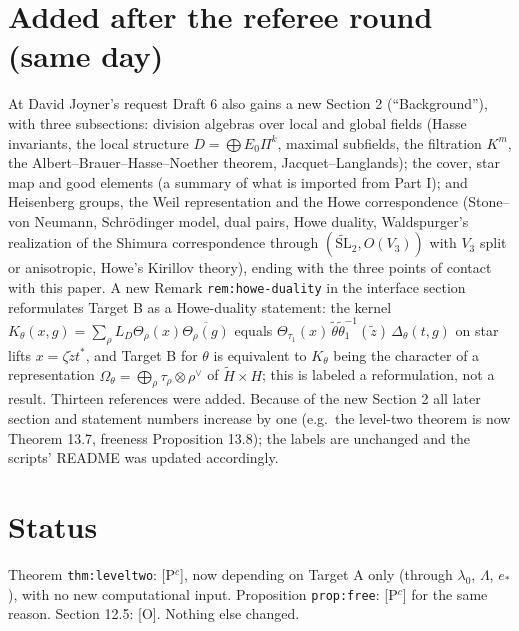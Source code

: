 \documentclass[11pt]{article}
\begin{document}
\section*{Added after the referee round (same day)}
At David Joyner's request Draft 6 also gains a new Section 2
(``Background''), with three subsections: division algebras over local
and global fields (Hasse invariants, the local structure
$D=\bigoplus E_0\Pi^k$, maximal subfields, the filtration $K^m$, the
Albert--Brauer--Hasse--Noether theorem, Jacquet--Langlands); the cover,
star map and good elements (a summary of what is imported from Part I);
and Heisenberg groups, the Weil representation and the Howe
correspondence (Stone--von Neumann, Schr\"odinger model, dual pairs,
Howe duality, Waldspurger's realization of the Shimura correspondence
through $(\widetilde{\mathrm{SL}}_2,O(V_3))$ with $V_3$ split or
anisotropic, Howe's Kirillov theory), ending with the three points of
contact with this paper.  A new Remark \texttt{rem:howe-duality} in the
interface section reformulates Target B as a Howe-duality statement:
the kernel $K_\theta(x,g)=\sum_\rho L_D\Theta_\rho(x)\overline{\Theta_\rho(g)}$
equals $\Theta_{\tau_1}(x)\,\tilde\theta\tilde\theta_1^{-1}(\tilde z)\,\Delta_\theta(t,g)$
on star lifts $x=\zeta\tilde zt^*$, and Target B for $\theta$ is
equivalent to $K_\theta$ being the character of a representation
$\Omega_\theta=\bigoplus_\rho\tau_\rho\otimes\rho^\vee$ of $\tilde H\times H$;
this is labeled a reformulation, not a result.  Thirteen references
were added.  Because of the new Section 2 all later section and
statement numbers increase by one (e.g.\ the level-two theorem is now
Theorem 13.7, freeness Proposition 13.8); the labels are unchanged and
the scripts' README was updated accordingly.

\section*{Status}
Theorem \texttt{thm:leveltwo}: [P$^c$], now depending on Target A only
(through $\lambda_0$, $\Lambda$, $e_*$), with no new computational
input.  Proposition \texttt{prop:free}: [P$^c$] for the same reason.
Section 12.5: [O].  Nothing else changed.
\end{document}
